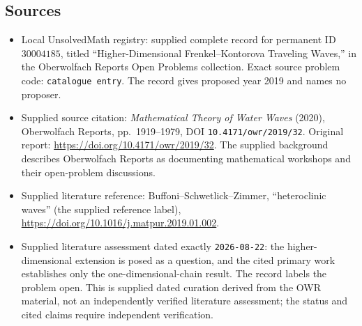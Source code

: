 \documentclass[11pt]{article}
\begin{document}
\subsection{Sources}
\begin{itemize}
\item Local UnsolvedMath registry: supplied complete record for permanent ID \(30004185\), titled ``Higher-Dimensional Frenkel--Kontorova Traveling Waves,'' in the Oberwolfach Reports Open Problems collection. Exact source problem code: \texttt{catalogue entry}. The record gives proposed year 2019 and names no proposer.
\item Supplied source citation: \emph{Mathematical Theory of Water Waves} (2020), Oberwolfach Reports, pp.~1919--1979, DOI \texttt{10.4171/owr/2019/32}. Original report: \url{https://doi.org/10.4171/owr/2019/32}. The supplied background describes Oberwolfach Reports as documenting mathematical workshops and their open-problem discussions.
\item Supplied literature reference: Buffoni--Schwetlick--Zimmer, ``heteroclinic waves'' (the supplied reference label), \url{https://doi.org/10.1016/j.matpur.2019.01.002}.
\item Supplied literature assessment dated exactly \texttt{2026-08-22}: the higher-dimensional extension is posed as a question, and the cited primary work establishes only the one-dimensional-chain result. The record labels the problem open. This is supplied dated curation derived from the OWR material, not an independently verified literature assessment; the status and cited claims require independent verification.
\end{itemize}
\end{document}
